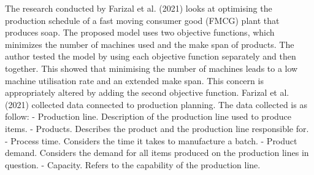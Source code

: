 \documentclass[a4paper,11pt,fleqn]{report}
\begin{document}
                The research conducted by Farizal et al. (2021) looks at optimising the production schedule of a fast moving consumer good (FMCG) plant that produces soap. The proposed model uses two objective functions, which minimizes the number of machines used and the make span of products. The author tested the model by using each objective function separately and then together. This showed that minimising the number of machines leads to a low machine utilisation rate and an extended make span. This concern is appropriately altered by adding the second objective function. Farizal et al. (2021) collected data connected to production planning. The data collected is as follow:
                    - Production line. Description of the production line used to produce items.
                    - Products. Describes the product and the production line responsible for.
                    - Process time. Considers the time it takes to manufacture a batch.
                    - Product demand. Considers the demand for all items produced on the production lines in question.
                    - Capacity. Refers to the capability of the production line.
                    
\end{document}

